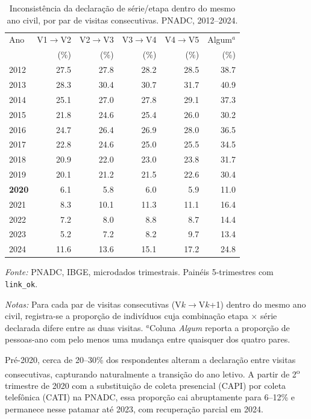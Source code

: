 \begin{table}[htbp]
\centering
\caption{Inconsist\^encia da declara\c{c}\~ao de s\'erie/etapa dentro do mesmo ano civil, por par de visitas consecutivas. PNADC, 2012--2024.}
\label{tab:inconsistencia_intra}
\begin{threeparttable}
\small
\begin{tabular}{lrrrrr}
\toprule
Ano & V1$\to$V2 & V2$\to$V3 & V3$\to$V4 & V4$\to$V5 & Algum$^{a}$ \\
    & (\%)      & (\%)      & (\%)      & (\%)      & (\%) \\
\midrule
2012 & 27.5 & 27.8 & 28.2 & 28.5 & 38.7 \\
2013 & 28.3 & 30.4 & 30.7 & 31.7 & 40.9 \\
2014 & 25.1 & 27.0 & 27.8 & 29.1 & 37.3 \\
2015 & 21.8 & 24.6 & 25.4 & 26.0 & 30.2 \\
2016 & 24.7 & 26.4 & 26.9 & 28.0 & 36.5 \\
2017 & 22.8 & 24.6 & 25.0 & 25.5 & 34.5 \\
2018 & 20.9 & 22.0 & 23.0 & 23.8 & 31.7 \\
2019 & 20.1 & 21.2 & 21.5 & 22.6 & 30.4 \\
\textbf{2020} & 6.1 & 5.8 & 6.0 & 5.9 & 11.0 \\
2021 & 8.3 & 10.1 & 11.3 & 11.1 & 16.4 \\
2022 & 7.2 & 8.0 & 8.8 & 8.7 & 14.4 \\
2023 & 5.2 & 7.2 & 8.2 & 9.7 & 13.4 \\
2024 & 11.6 & 13.6 & 15.1 & 17.2 & 24.8 \\
\bottomrule
\end{tabular}
\begin{tablenotes}\footnotesize
\item \textit{Fonte:} PNADC, IBGE, microdados trimestrais. Pain\'eis 5-trimestres com \texttt{link\_ok}.
\item \textit{Notas:} Para cada par de visitas consecutivas (V$k$$\to$V$k$+1) dentro do mesmo ano civil, registra-se a propor\c{c}\~ao de indiv\'iduos cuja combina\c{c}\~ao etapa $\times$ s\'erie declarada difere entre as duas visitas. $^{a}$Coluna \emph{Algum} reporta a propor\c{c}\~ao de pessoas-ano com pelo menos uma mudan\c{c}a entre quaisquer dos quatro pares.
\item Pr\'e-2020, cerca de 20--30\% dos respondentes alteram a declara\c{c}\~ao entre visitas consecutivas, capturando naturalmente a transi\c{c}\~ao do ano letivo. A partir de 2\textsuperscript{o} trimestre de 2020 com a substitui\c{c}\~ao de coleta presencial (CAPI) por coleta telef\^onica (CATI) na PNADC, essa propor\c{c}\~ao cai abruptamente para 6--12\% e permanece nesse patamar at\'e 2023, com recupera\c{c}\~ao parcial em 2024.
\end{tablenotes}
\end{threeparttable}
\end{table}
